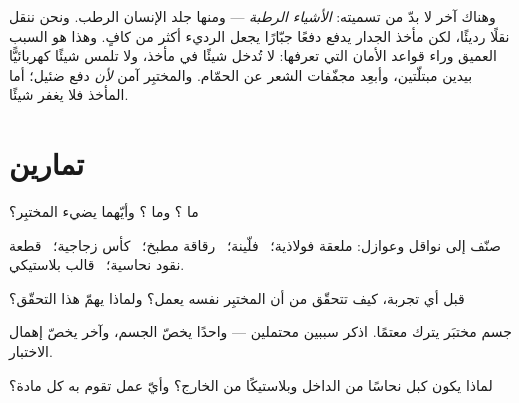\begin{remark}\label{rem:g4:conductors-insulators:safety}
وهناك  آخر لا بدّ من تسميته: \emph{الأشياء الرطبة} ---
ومنها جلد الإنسان الرطب. ونحن ننقل نقلًا رديئًا، لكن مأخذ الجدار
يدفع دفعًا جبّارًا يجعل الرديء أكثر من كافٍ. وهذا هو السبب
العميق وراء قواعد الأمان التي تعرفها: لا تُدخل شيئًا في مأخذ،
ولا تلمس شيئًا كهربائيًّا بيدين مبتلّتين، وأبعِد مجفّفات الشعر
عن الحمّام. والمختبِر  آمن \emph{لأن} دفع 
ضئيل؛ أما المأخذ فلا يغفر شيئًا.
\end{remark}

\section{تمارين}

\begin{exercise}[$\star$]\label{exo:g4:conductors-insulators:1}
ما ؟ وما ؟ وأيّهما يضيء  المختبِر؟
\end{exercise}

\begin{exercise}[$\star$]\label{exo:g4:conductors-insulators:2}
صنّف إلى نواقل وعوازل: ملعقة فولاذية؛ \ فلّينة؛ \ رقاقة مطبخ؛
\ كأس زجاجية؛ \ قطعة نقود نحاسية؛ \ قالب بلاستيكي.
\end{exercise}

\begin{exercise}[$\star$]\label{exo:g4:conductors-insulators:3}
قبل أي تجربة، كيف تتحقّق من أن المختبِر نفسه يعمل؟ ولماذا يهمّ
هذا التحقّق؟
\end{exercise}

\begin{exercise}[$\star$]\label{exo:g4:conductors-insulators:4}
جسم مختبَر يترك  معتمًا. اذكر سببين محتملين --- واحدًا
يخصّ الجسم، وآخر يخصّ إهمال الاختبار.
\end{exercise}

\begin{exercise}[$\star$]\label{exo:g4:conductors-insulators:5}
لماذا يكون كبل  نحاسًا من الداخل وبلاستيكًا من الخارج؟
وأيّ عمل تقوم به كل مادة؟
\end{exercise}

